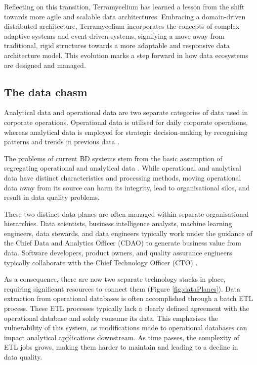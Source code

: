 \documentclass[preprint,12pt]{elsarticle}
\begin{document}
Reflecting on this transition, Terramycelium has learned a lesson from the shift towards more agile and scalable data architectures. Embracing a domain-driven distributed architecture, Terramycelium incorporates the concepts of complex adaptive systems and event-driven systems, signifying a move away from traditional, rigid structures towards a more adaptable and responsive data architecture model. This evolution marks a step forward in how data ecosystems are designed and managed.

\subsection{The data chasm}

Analytical data and operational data are two separate categories of data used in corporate operations. Operational data is utilised for daily corporate operations, whereas analytical data is employed for strategic decision-making by recognising patterns and trends in previous data \cite{kimball2013data}.

The problems of current BD systems stem from the basic assumption of segregating operational and analytical data \cite{ataei2022state}. While operational and analytical data have distinct characteristics and processing methods,  moving operational data away from its source can harm its integrity, lead to organisational silos, and result in data quality problems. 

These two distinct data planes are often managed within separate organisational hierarchies. Data scientists, business intelligence analysts, machine learning engineers, data stewards, and data engineers typically work under the guidance of the Chief Data and Analytics Officer (CDAO) to generate business value from data. Software developers, product owners, and quality assurance engineers typically collaborate with the Chief Technology Officer (CTO) \cite{DataMesh}.

As a consequence, there are now two separate technology stacks in place, requiring significant resources to connect them (Figure \ref{fig:dataPlanes}). Data extraction from operational databases is often accomplished through a batch ETL process. These ETL processes typically lack a clearly defined agreement with the operational database and solely consume its data. This emphasises the vulnerability of this system, as modifications made to operational databases can impact analytical applications downstream. As time passes, the complexity of ETL jobs grows, making them harder to maintain and leading to a decline in data quality. 
\end{document}
